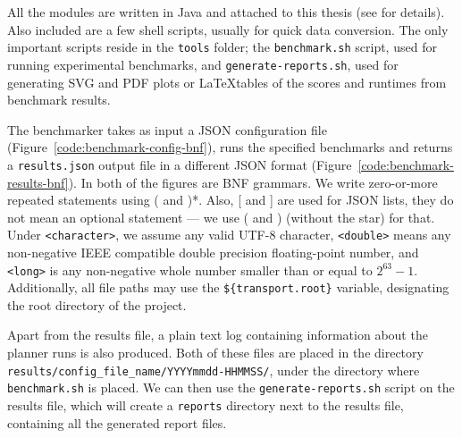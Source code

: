 All the modules are written in Java and attached to this thesis (see  for details). Also included are a few shell scripts, usually for quick
data conversion. The only important scripts reside in the \texttt{tools} folder;
the \texttt{benchmark.sh} script, used for running experimental benchmarks,
and \texttt{generate-reports.sh}, used for generating SVG and PDF plots or \LaTeX tables of the scores and runtimes from benchmark results.

The benchmarker takes as input a JSON \citep{Bray2014} configuration file (Figure~\ref{code:benchmark-config-bnf}),
runs the specified benchmarks and returns a \texttt{results.json} output file in a different JSON format (Figure~\ref{code:benchmark-results-bnf}).
In both of the figures are BNF grammars. We write zero-or-more repeated statements using ( and )*. Also, [ and ] are used for JSON lists, they do not mean an optional statement --- we use ( and ) (without the star) for that.
Under \texttt{<character>}, we assume any valid UTF-8 character,
\texttt{<double>} means any non-negative IEEE compatible double precision floating-point number,
and \texttt{<long>} is any non-negative whole number smaller than or equal to $2^{63}-1$.
Additionally, all file paths may use the \verb+${transport.root}+ variable, designating the
root directory of the project.

Apart from the results file, a plain text log containing information about the planner
runs is also produced. Both of these files are placed in the directory \texttt{results/config\_file\_name/YYYYmmdd-HHMMSS/}, under the directory where \texttt{benchmark.sh} is placed.
We can then use the \texttt{generate-reports.sh} script on the results file,
which will create a \texttt{reports} directory next to the results file,
containing all the generated report files.

